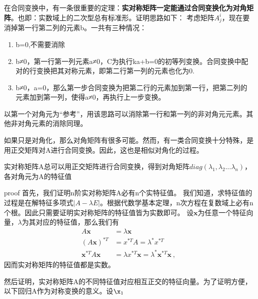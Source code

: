 在合同变换中，有一条很重要的定理：\textbf{实对称矩阵一定能通过合同变换化为对角矩阵}。也即：实数域上的二次型总有标准形。证明思路如下：
考虑矩阵$A^i_j$，现在要消掉第一行第二列的元素b。一共有三种情况：
\begin{enumerate}
\item b=0,不需要消除
\item b≠0，第一行第一列元素a≠0，C为执行ka+b=0的初等列变换。合同变换中配对的行变换把其对称元素，即第二行第一列的元素也化为0.
\item b≠0，a=0，那么第一步合同变换为把第二行的元素加到第一行，把第二列的元素加到第一列，使得a≠0，再执行上一步变换。
\end{enumerate}
以第一个对角元为“参考”，用该思路可以消除第一行和第一列的非对角元元素。其他非对角元素的消除同理。

如果只是对角化，那么对角矩阵有很多可能。然而，有一类合同变换十分特殊，是用正交矩阵对A进行合同变换。因此，这也是相似对角化的过程。
\begin{theorem}{}
实对称矩阵A总可以用正交矩阵进行合同变换，得到对角矩阵$diag(\lambda_1,\lambda_2...\lambda_n)$，各对角元为A的特征值
\end{theorem}  

proof
首先，我们证明n阶实对称矩阵A必有n个实特征值。
我们知道，求特征值的过程是在解特征多项式$|A-\lambda E|$。根据代数学基本定理，n次方程在复数域上必有n个根。因此只需要证明实对称矩阵的特征值皆为实数即可。
设$\boldsymbol x$为任意一个特征向量，$\lambda$为其对应的特征值，那么我们有
\begin{equation}
\begin{aligned}
A\boldsymbol x&=\lambda \boldsymbol x\\
(A\boldsymbol x)^{*T}&=x^{*T}A=\lambda^{*}x^{*T}\\
\boldsymbol x^{*T}A\boldsymbol x&=\lambda x^{*T}\boldsymbol x=\lambda^{*}\boldsymbol x^{*T}\boldsymbol x~,
\end{aligned}
\end{equation}
因而实对称矩阵的特征值都是实数。

然后证明，实对称矩阵A的不同特征值对应相互正交的特征向量。为了证明方便，以下回归A作为对称变换的意义。设$\x_1$
